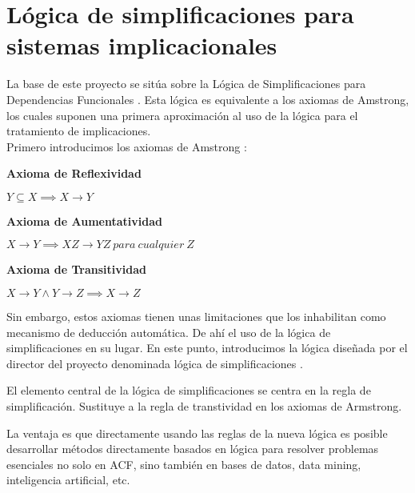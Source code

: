 \section{L\'ogica de simplificaciones para sistemas implicacionales}


La base de este proyecto se sit\'ua sobre la L\'ogica de Simplificaciones para Dependencias Funcionales \cite{Cordero2002}. Esta l\'ogica es equivalente a los axiomas de Amstrong, los cuales suponen una primera aproximaci\'on al uso de la l\'ogica para el tratamiento de implicaciones.\\

Primero introducimos los axiomas de Amstrong \cite{Armstrong1974DependencySO}:

\textbf{Axioma de Reflexividad}

\begin{center}
    \(Y \subseteq X \implies X \to Y \)
\end{center}

\textbf{Axioma de Aumentatividad}

\begin{center}
    \(X \to Y \implies XZ \to YZ \ para \ cualquier \ Z \)
\end{center}

\textbf{Axioma de Transitividad}

\begin{center}
    \(X \to Y \wedge Y \to Z \implies X \to Z \)
\end{center}

Sin embargo, estos axiomas tienen unas limitaciones que los inhabilitan como mecanismo de deducci\'on autom\'atica. De ah\'i el uso de la l\'ogica de simplificaciones en su lugar. En este punto, introducimos la l\'ogica dise\~nada por el director del proyecto denominada l\'ogica de simplificaciones \cite{Cordero2002}.

El elemento central de la l\'ogica de simplificaciones se centra en la regla de simplificaci\'on. Sustituye a la regla de transtividad en los axiomas de Armstrong.

La ventaja es que directamente usando las reglas de la nueva l\'ogica es posible desarrollar m\'etodos directamente basados en l\'ogica para resolver problemas esenciales no solo en ACF, sino tambi\'en en bases de datos, data mining, inteligencia artificial, etc. 

